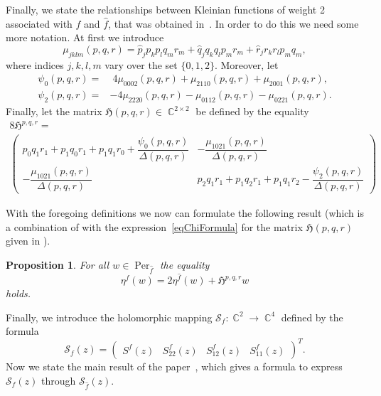 \documentclass{amsart}
\numberwithin{equation}{section}
\newtheorem{proposition}[theorem]{Proposition}
\theoremstyle{definition}
\theoremstyle{remark}
\DeclareMathOperator{\CC}{\mathbb C}
\DeclareMathOperator{\Per}{Per}
\begin{document}
	Finally, we state the relationships between Kleinian functions of weight 2 associated with $f$ and $\hat f$, that was obtained in~\cite{RichelotExpression}. In order to do this we need some more notation. At first we introduce
	\begin{equation*}
		\mu_{jklm}(p,q,r) = \hat p_j p_k p_lq_mr_m + \hat q_j q_k q_lp_mr_m + \hat r_j r_k r_lp_mq_m,
	\end{equation*}
	where indices $j,k,l,m$ vary over the set $\{0,1,2\}$. Moreover, let \[
	\begin{split}
		\psi_0(p,q,r) = & \; 4\mu_{0002}(p,q,r) + \mu_{2110}(p,q,r) + \mu_{2001}(p,q,r), \\
		\psi_2(p,q,r) = & -4\mu_{2220}(p,q,r) - \mu_{0112}(p,q,r) - \mu_{0221}(p,q,r).
	\end{split}  
	\]
	Finally, let the matrix $\mathfrak H(p,q,r) \in \CC^{2 \times 2}$ be defined by the equality
	\begin{multline}\label{eqChiFormula}
		8\mathfrak H^{p,q,r} = \\ \begin{pmatrix}
			p_0q_1r_1 + p_1q_0r_1 + p_1q_1r_0 + \dfrac{\psi_0(p,q,r)}{\Delta(p,q,r)} & -\dfrac{\mu_{1021}(p,q,r)}{\Delta(p,q,r)} \\
			-\dfrac{\mu_{1021}(p,q,r)}{\Delta(p,q,r)} & p_2q_1r_1 + p_1q_2r_1 + p_1q_1r_2 - \dfrac{\psi_2(p,q,r)}{\Delta(p,q,r)}
		\end{pmatrix}
	\end{multline}
	
	With the foregoing definitions we now can formulate the following result (which is a combination of \cite[Lemma~3.3]{RichelotExpression} with the expression~\eqref{eqChiFormula} for the matrix $\mathfrak H(p,q,r)$ given in \cite[Subsection~4.2]{RichelotExpression}).
	
	\begin{proposition}\label{propEtaTransformation}
		For all $w \in \Per_{\hat f}$ the equality
		\begin{equation}\label{eqEtaTransformation}
			\eta^f(w) = 2\eta^{\hat f}(w) + \mathfrak H^{p,q,r}w
		\end{equation}
		holds.
	\end{proposition}
	
	
	Finally, we introduce the holomorphic mapping $\mathscr S_f:\CC^2 \to \CC^4$ defined by the formula
	\begin{equation*}
		\mathscr S_f(z) = \begin{pmatrix}
			S^f(z) & S_{22}^f(z) & S_{12}^f(z) &  S_{11}^f(z)
		\end{pmatrix}^T.
	\end{equation*}
	Now we state the main result of the paper~\cite{RichelotExpression}, which gives a formula to express $\mathscr S_f(z)$ through $\mathscr S_{\hat f}(z)$.
	
\end{document}
